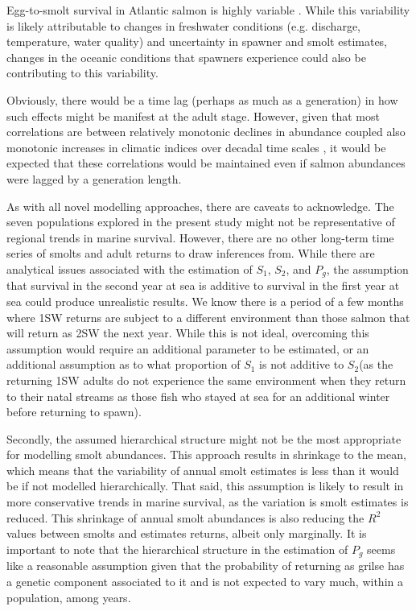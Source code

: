 \documentclass[12pt]{article}
\newcommand{\So}{$S_{1}$\xspace}
\newcommand{\St}{$S_{2}$\xspace}
\newcommand{\Pg}{$P_g$\xspace}
\begin{document}

Egg-to-smolt survival in Atlantic salmon is highly variable
\citep{Klemetsen2003,Chaput2015}.
While this variability is likely attributable to changes in freshwater
conditions (e.g. discharge, temperature, water quality) and uncertainty in
spawner and smolt estimates, 
changes in the oceanic conditions that spawners experience could also be
contributing to this variability.

Obviously, there would be a time lag (perhaps as much as a generation) in how such effects
might be manifest at the adult stage.
However, given that most correlations are between relatively monotonic declines
in abundance coupled also monotonic increases in climatic indices
over decadal time scales \citep[e.g.,][]{Friedland1998, Todd2008,
    Beaugrand2012}, it would be expected that these correlations would be
maintained even if salmon abundances were lagged by a generation length.


As with all novel modelling approaches, there are caveats to acknowledge.
The seven populations explored in the present study might not be representative
of regional trends in marine survival. However, there are no other
long-term time series of smolts and adult returns to draw inferences from.
While there are analytical issues associated with the estimation of \So, \St, and \Pg,
the assumption that survival in the second year at sea is additive to survival in the first 
year at sea could produce unrealistic results.
We know there is a period of a few months where 1SW 
returns are subject to a different environment than those salmon that will
return as 2SW the next year. 
While this is not ideal,
overcoming this assumption would require an additional parameter to be
estimated, or an additional assumption as to what proportion of \So is not
additive to \St (as the returning 1SW adults do not experience the same
environment when they return to their natal streams as those fish who stayed
at sea for an additional winter before returning to spawn).

Secondly, the assumed hierarchical structure might not be the most appropriate
for modelling smolt abundances. This approach results in shrinkage to the
mean, which means that the variability of annual smolt estimates is less than
it would be if not modelled hierarchically. 
That said, this assumption is likely to result in more conservative trends in
marine survival, as the variation is smolt estimates is reduced.
This shrinkage of annual smolt abundances is also reducing the $R^2$ values 
between smolts and estimates returns, albeit only marginally.
It is important to note that the hierarchical structure in the estimation of
\Pg seems like a reasonable assumption given that the probability of returning
as grilse has a genetic component associated to it \citep{Aykanat2019} and is
not expected to vary much, within a population, among years.
\end{document}
